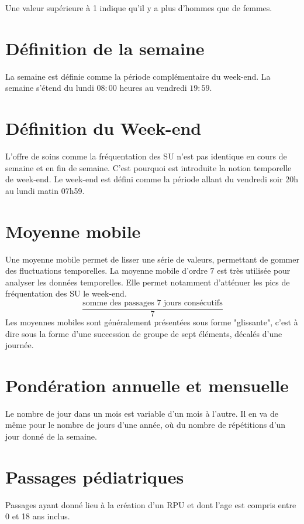 \documentclass[12pt,english,french,twoside]{report}\usepackage[]{graphicx}\usepackage[]{color}
\begin{document}
Une valeur supérieure à 1 indique qu'il y a plus d'hommes que de femmes.

\section*{Définition de la semaine}
La semaine est définie comme la période complémentaire du week-end. La semaine s'étend du lundi $08:00$ heures au vendredi $19:59$.

\section*{Définition du Week-end}
L'offre de soins comme la fréquentation des SU n'est pas identique en cours de semaine et en fin de semaine. C'est pourquoi est introduite la notion temporelle de week-end.
Le week-end est défini comme la période allant du vendredi soir 20h au lundi matin 07h59.

\section*{Moyenne mobile}
Une moyenne mobile permet de lisser une série de valeurs, permettant de gommer des fluctuations temporelles. La moyenne mobile d'ordre $7$ est très utilisée pour analyser les données temporelles. Elle permet notamment d'atténuer les pics de fréquentation des SU le week-end.
\begin{displaymath}
    \frac{\text{somme des passages 7 jours consécutifs}}{7}
\end{displaymath}
Les moyennes mobiles sont généralement présentées sous forme "glissante", c'est à dire sous la forme d'une succession de groupe de sept éléments, décalés d'une journée.

\section*{Pondération annuelle et mensuelle}
Le nombre de jour dans un mois est variable d'un mois à l'autre. Il en va de même pour le nombre de jours d'une année, où du nombre de répétitions d'un jour donné de la semaine.

\section*{Passages pédiatriques}
Passages ayant donné lieu à la création d'un RPU et dont l'age est compris entre 0 et 18 ans inclus.
\end{document}
